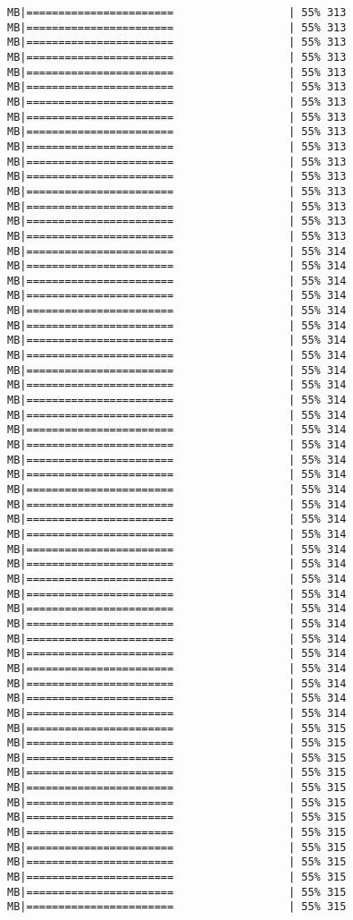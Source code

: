 \documentclass[
]{article}
\begin{document}
\begin{verbatim}
MB|=======================                  | 55% 313 MB|=======================                  | 55% 313 MB|=======================                  | 55% 313 MB|=======================                  | 55% 313 MB|=======================                  | 55% 313 MB|=======================                  | 55% 313 MB|=======================                  | 55% 313 MB|=======================                  | 55% 313 MB|=======================                  | 55% 313 MB|=======================                  | 55% 313 MB|=======================                  | 55% 313 MB|=======================                  | 55% 313 MB|=======================                  | 55% 313 MB|=======================                  | 55% 313 MB|=======================                  | 55% 313 MB|=======================                  | 55% 313 MB|=======================                  | 55% 314 MB|=======================                  | 55% 314 MB|=======================                  | 55% 314 MB|=======================                  | 55% 314 MB|=======================                  | 55% 314 MB|=======================                  | 55% 314 MB|=======================                  | 55% 314 MB|=======================                  | 55% 314 MB|=======================                  | 55% 314 MB|=======================                  | 55% 314 MB|=======================                  | 55% 314 MB|=======================                  | 55% 314 MB|=======================                  | 55% 314 MB|=======================                  | 55% 314 MB|=======================                  | 55% 314 MB|=======================                  | 55% 314 MB|=======================                  | 55% 314 MB|=======================                  | 55% 314 MB|=======================                  | 55% 314 MB|=======================                  | 55% 314 MB|=======================                  | 55% 314 MB|=======================                  | 55% 314 MB|=======================                  | 55% 314 MB|=======================                  | 55% 314 MB|=======================                  | 55% 314 MB|=======================                  | 55% 314 MB|=======================                  | 55% 314 MB|=======================                  | 55% 314 MB|=======================                  | 55% 314 MB|=======================                  | 55% 314 MB|=======================                  | 55% 314 MB|=======================                  | 55% 314 MB|=======================                  | 55% 315 MB|=======================                  | 55% 315 MB|=======================                  | 55% 315 MB|=======================                  | 55% 315 MB|=======================                  | 55% 315 MB|=======================                  | 55% 315 MB|=======================                  | 55% 315 MB|=======================                  | 55% 315 MB|=======================                  | 55% 315 MB|=======================                  | 55% 315 MB|=======================                  | 55% 315 MB|=======================                  | 55% 315 MB|=======================                  | 55% 315 
\end{verbatim}
\end{document}
